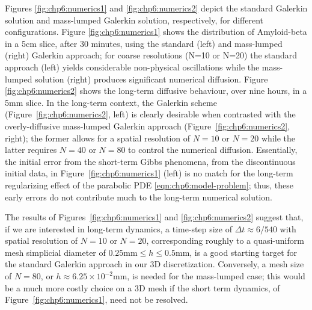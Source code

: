 Figures \ref{fig:chp6:numerics1} and \ref{fig:chp6:numerics2} depict the standard 
Galerkin solution and mass-lumped Galerkin solution, respectively, for different 
configurations.  Figure \ref{fig:chp6:numerics1} shows the distribution of Amyloid-beta 
in a 5cm slice, after 30 minutes, using the standard (left) and mass-lumped (right) 
Galerkin approach; for coarse resolutions (N=10 or N=20) the standard approach (left) 
yields considerable non-physical oscillations while the mass-lumped solution (right) 
produces significant numerical diffusion.  Figure \ref{fig:chp6:numerics2} shows the 
long-term diffusive behaviour, over nine hours, in a 5mm slice.  In the long-term 
context, the Galerkin scheme (Figure~\ref{fig:chp6:numerics2}, left) is clearly 
desirable when contrasted with the overly-diffusive mass-lumped Galerkin 
approach (Figure~\ref{fig:chp6:numerics2}, right); the former allows for a spatial 
resolution of $N=10$ or $N=20$ while the latter requires $N=40$ or $N=80$ to control 
the numerical diffusion.  Essentially, the initial error from the short-term Gibbs 
phenomena, from the discontinuous initial data, in Figure~\ref{fig:chp6:numerics1} (left) 
is no match for the long-term regularizing effect of the parabolic PDE 
\eqref{eqn:chp6:model-problem}; thus, these early errors do not contribute much 
to the long-term numerical solution.  

The results of Figures~\ref{fig:chp6:numerics1} and \ref{fig:chp6:numerics2} suggest 
that, if we are interested in long-term dynamics, a time-step size of 
$\Delta t \approx 6/540$ with spatial resolution of $N=10$ or $N=20$, corresponding 
roughly to a quasi-uniform mesh simplicial diameter of $0.25 \mbox{mm} \leq h \leq 0.5 \mbox{mm}$, is 
a good starting target for the standard Galerkin approach in our 3D discretization.  
Conversely, a mesh size of $N=80$, or $h\approx 6.25\times 10^{-2}\mbox{mm}$, is needed 
for the mass-lumped case; this would be a much more costly choice on a 3D 
mesh if the short term dynamics, of Figure~\ref{fig:chp6:numerics1}, need not be 
resolved. 


